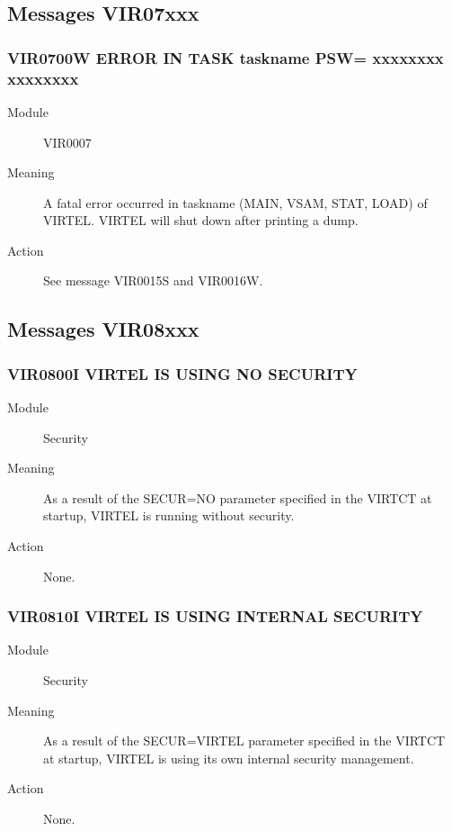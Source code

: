 \documentclass[letterpaper,10pt,english]{sphinxmanual}
\begin{document}
\subsection{Messages VIR07xxx}
\label{\detokenize{messages:messages-vir07xxx}}

\subsubsection{VIR0700W ERROR IN TASK taskname PSW= xxxxxxxx xxxxxxxx}
\label{\detokenize{messages:vir0700w-error-in-task-taskname-psw-xxxxxxxx-xxxxxxxx}}\begin{description}
\item[{Module}] \leavevmode
VIR0007

\item[{Meaning}] \leavevmode
A fatal error occurred in taskname (MAIN, VSAM, STAT, LOAD) of VIRTEL. VIRTEL will shut down after printing a dump.

\item[{Action}] \leavevmode
See message VIR0015S and VIR0016W.

\end{description}


\subsection{Messages VIR08xxx}
\label{\detokenize{messages:messages-vir08xxx}}

\subsubsection{VIR0800I VIRTEL IS USING NO SECURITY}
\label{\detokenize{messages:vir0800i-virtel-is-using-no-security}}\begin{description}
\item[{Module}] \leavevmode
Security

\item[{Meaning}] \leavevmode
As a result of the SECUR=NO parameter specified in the VIRTCT at startup, VIRTEL is running without security.

\item[{Action}] \leavevmode
None.

\end{description}


\subsubsection{VIR0810I VIRTEL IS USING INTERNAL SECURITY}
\label{\detokenize{messages:vir0810i-virtel-is-using-internal-security}}\begin{description}
\item[{Module}] \leavevmode
Security

\item[{Meaning}] \leavevmode
As a result of the SECUR=VIRTEL parameter specified in the VIRTCT at startup, VIRTEL is using its own internal security management.

\item[{Action}] \leavevmode
None.

\end{description}
\end{document}
